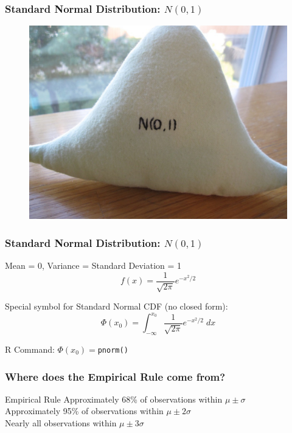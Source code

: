 \documentclass[handout]{beamer}
\begin{document}
\begin{frame}
\frametitle{Standard Normal Distribution: $N(0,1)$}
\begin{figure}
\includegraphics[scale = 0.2]{./images/normal_etsy2}
\end{figure}
\end{frame}
\begin{frame}
\frametitle{Standard Normal Distribution: $N(0,1)$}
Mean = 0, Variance = Standard Deviation = 1
	$$f(x) = \frac{1}{\sqrt{2\pi}} e^{-x^2/2}$$

Special symbol for Standard Normal CDF (no closed form):
	$$\Phi(x_0) = \int_{-\infty}^{x_0}\frac{1}{\sqrt{2\pi}} e^{-x^2/2}\; dx $$
	
R Command: $\Phi(x_0) =$\texttt{pnorm()}
\end{frame}



\begin{frame}
\frametitle{Where does the Empirical Rule come from?}

\begin{block}{Empirical Rule}
Approximately 68\% of observations within $\mu\pm \sigma$\\
Approximately 95\% of observations within $\mu\pm 2 \sigma$\\
Nearly all observations within $\mu\pm 3 \sigma$\\
\end{block}
\end{frame}
\end{document}
